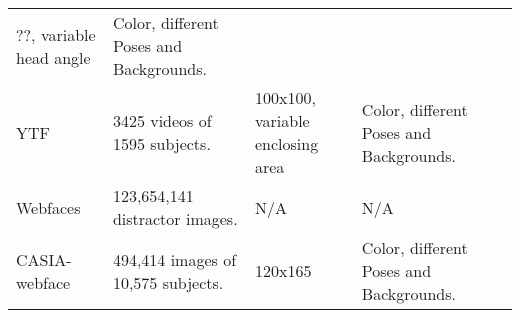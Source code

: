 \documentclass[17pt,]{extarticle}
\begin{document}
\begin{longtable}[]{@{}lllll@{}}
\begin{minipage}[t]{0.14\columnwidth}
??, variable head angle\strut
\end{minipage} & \begin{minipage}[t]{0.19\columnwidth}\raggedright
Color, different Poses and Backgrounds.\strut
\end{minipage} & \begin{minipage}[t]{0.20\columnwidth}\raggedright
\autocite{huang2008}\strut
\end{minipage}\tabularnewline
\begin{minipage}[t]{0.09\columnwidth}\raggedright
YTF\strut
\end{minipage} & \begin{minipage}[t]{0.24\columnwidth}\raggedright
3425 videos of 1595 subjects.\strut
\end{minipage} & \begin{minipage}[t]{0.14\columnwidth}\raggedright
100x100, variable enclosing area\strut
\end{minipage} & \begin{minipage}[t]{0.19\columnwidth}\raggedright
Color, different Poses and Backgrounds.\strut
\end{minipage} & \begin{minipage}[t]{0.20\columnwidth}\raggedright
\autocite{wolf2011}\strut
\end{minipage}\tabularnewline
\begin{minipage}[t]{0.09\columnwidth}\raggedright
Webfaces\strut
\end{minipage} & \begin{minipage}[t]{0.24\columnwidth}\raggedright
123,654,141 distractor images.\strut
\end{minipage} & \begin{minipage}[t]{0.14\columnwidth}\raggedright
N/A\strut
\end{minipage} & \begin{minipage}[t]{0.19\columnwidth}\raggedright
N/A\strut
\end{minipage} & \begin{minipage}[t]{0.20\columnwidth}\raggedright
\autocite{otto2018}\strut
\end{minipage}\tabularnewline
\begin{minipage}[t]{0.09\columnwidth}\raggedright
CASIA-webface\strut
\end{minipage} & \begin{minipage}[t]{0.24\columnwidth}\raggedright
494,414 images of 10,575 subjects.\strut
\end{minipage} & \begin{minipage}[t]{0.14\columnwidth}\raggedright
120x165\strut
\end{minipage} & \begin{minipage}[t]{0.19\columnwidth}\raggedright
Color, different Poses and Backgrounds.\strut
\end{minipage} & \begin{minipage}[t]{0.20\columnwidth}\raggedright
\autocite{yi2014}\strut
\end{minipage}\tabularnewline
\bottomrule
\end{longtable}
\end{document}
